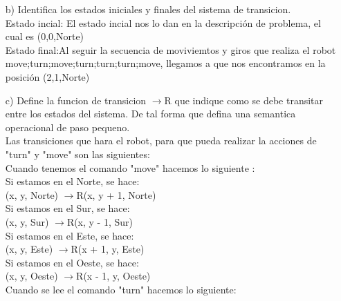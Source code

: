 \documentclass{article}
\begin{document}
\begin{itemize}
\begin{itemize}
                    \item[b)] Identifica los estados iniciales y finales del sistema de transicion.\\

                    Estado incial: El estado incial nos lo dan en la descripción de problema, el cual es (0,0,Norte)\\

                    Estado final:Al seguir la secuencia de moviviemtos y giros que realiza el robot move;turn;move;turn;turn;turn;move, llegamos a que nos encontramos en la posición (2,1,Norte)\\
                    
                    \item[c)] Define la funcion de transicion $\rightarrow$R que indique como se debe transitar entre los estados del sistema. De tal forma que defina una semantica operacional de paso pequeno.\\

                    Las transiciones que hara el robot, para que pueda realizar la acciones de "turn" y "move" son las siguientes:\\
                    
                    Cuando tenemos el comando "move" hacemos lo siguiente :\\
                    
                    Si estamos en el Norte, se hace:\\
                    (x, y, Norte) $\rightarrow$R(x, y + 1, Norte)\\
                    Si estamos en el Sur, se hace:\\
                    (x, y, Sur) $\rightarrow$R(x, y - 1, Sur)\\
                    Si estamos en el Este, se hace:\\
                    (x, y, Este) $\rightarrow$R(x + 1, y, Este)\\
                    Si estamos en el Oeste, se hace:\\
                    (x, y, Oeste) $\rightarrow$R(x - 1, y, Oeste)\\

                    Cuando se lee el comando "turn" hacemos lo siguiente:\\


\end{itemize}
\end{itemize}
\end{document}
